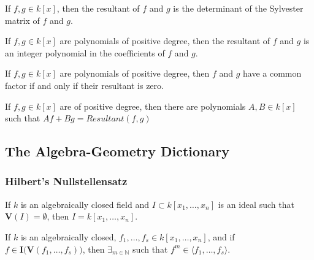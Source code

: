 \documentclass[crop=false,class=book,oneside]{standalone}
\begin{document}
\begin{theorem}
If $f,g \in k[x]$, then the resultant of $f$ and $g$ is the determinant of the Sylvester matrix of $f$ and $g$.
\end{theorem}
\begin{theorem}
If $f,g\in k[x]$ are polynomials of positive degree, then the resultant of $f$ and $g$ is an integer polynomial in the coefficients of $f$ and $g$.
\end{theorem}
\begin{theorem}
If $f,g\in k[x]$ are polynomials of positive degree, then $f$ and $g$ have a common factor if and only if their resultant is zero.
\end{theorem}
\begin{theorem}
If $f,g\in k[x]$ are of positive degree, then there are polynomials $A,B \in k[x]$ such that $Af + Bg = Resultant(f,g)$
\end{theorem}
\subsection{The Algebra-Geometry Dictionary}
\subsubsection{Hilbert's Nullstellensatz}
\begin{theorem}
If $k$ is an algebraically closed field and $I \subset k[x_1,\hdots ,x_n]$ is an ideal such that $\mathbf{V}(I) = \emptyset$, then $I = k[x_1,\hdots ,x_n]$.
\end{theorem}
\begin{theorem}
If $k$ is an algebraically closed, $f_{1},\hdots,f_{s}\in k[x_{1},\hdots,x_{n}]$, and if $f\in \textbf{I}\big(\mathbf{V}(f_1,\hdots, f_s)\big)$, then $\exists_{m\in\mathbb{N}}$ such that $f^m \in \langle f_1,\hdots, f_s \rangle$.
\end{theorem}
\end{document}
